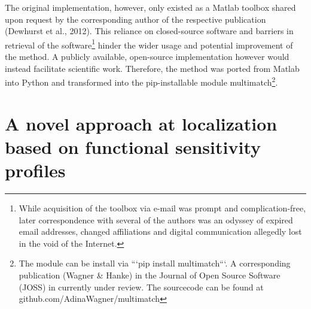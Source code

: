 \documentclass[a4paper, 12pt]{scrreprt}
\begin{document}
The original implementation, however, only existed as a Matlab toolbox shared upon request by the corresponding author of the respective publication (Dewhurst et al., 2012). This reliance on closed-source software and barriers in retrieval of the software\footnote{While acquisition of the toolbox via e-mail was prompt and complication-free, later correspondence with several of the authors was an odyssey of expired email addresses, changed affiliations and digital communication allegedly lost in the void of the Internet.} hinder the wider usage and potential improvement of the method. A publicly available, open-source implementation however would instead facilitate scientific work. Therefore, the method was ported from Matlab into Python and transformed into the pip-installable module multimatch\footnote{The module can be install via ```pip install multimatch```. A corresponding publication (Wagner \& Hanke) in the Journal of Open Source Software (JOSS) in currently under review. The sourcecode can be found at github.com/AdinaWagner/multimatch}.

\section{A novel approach at localization based on functional sensitivity profiles}\label{section:methodintroduction}
\end{document}
